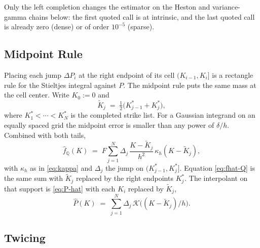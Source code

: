 \documentclass[preprint,12pt,authoryear,times]{elsarticle}
\newcommand{\Q}{\mathbb{Q}}
\begin{document}
Only the left completion changes the estimator on the Heston and variance-gamma chains below: the first quoted call is at intrinsic, and the last quoted call is already zero (dense) or of order \(10^{-5}\) (sparse).

\subsection{Midpoint Rule}
\label{sec:mid}

Placing each jump \(\Delta P_i\) at the right endpoint of its cell \((K_{i-1},K_i]\) is a rectangle rule for the Stieltjes integral against \(P\). The midpoint rule puts the same mass at the cell center. Write \(K_0:=0\) and
\begin{equation}
\label{eq:mid}
\tilde K_j
\;=\;
\tfrac12\bigl(K_{j-1}^{\ast}+K_j^{\ast}\bigr),
\end{equation}
where \(K_1^{\ast}<\cdots<K_N^{\ast}\) is the completed strike list. For a Gaussian integrand on an equally spaced grid the midpoint error is smaller than any power of \(\delta/h\). Combined with both tails,
\begin{equation}
\label{eq:headline}
\hat f_{\Q}(K)
\;=\;
F\sum_{j=1}^{N}\Delta_j\,\frac{K-\tilde K_j}{h^2}\,\kappa_h(K-\tilde K_j),
\end{equation}
with \(\kappa_h\) as in \eqref{eq:kappa} and \(\Delta_j\) the jump on \((K_{j-1}^{\ast},K_j^{\ast}]\). Equation \eqref{eq:fhat-Q} is the same sum with \(\tilde K_j\) replaced by the right endpoints \(K_j^{\ast}\). The interpolant on that support is \eqref{eq:P-hat} with each \(K_i\) replaced by \(\tilde K_j\),
\begin{equation}
\label{eq:P-hat-mid}
\hat P(K)
\;=\;
\sum_{j=1}^{N}\Delta_j\,\mathcal{K}\bigl((K-\tilde K_j)/h\bigr).
\end{equation}

\subsection{Twicing}
\label{sec:twice}
\end{document}
